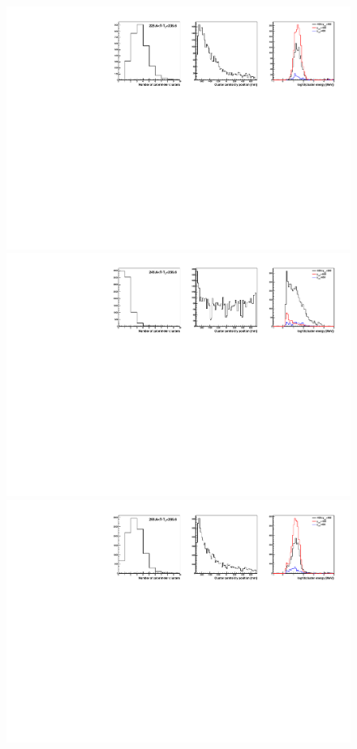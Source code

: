 \documentclass[preprint]{aastex631}
\begin{document}
\begin{figure}[t]
    \centering
    \includegraphics[width=0.9\linewidth]{paper_showEnergyCal_225p61_235p61_400.pdf}
    \includegraphics[width=0.9\linewidth]{paper_showEnergyCal_245p61_255p61_650.pdf}
    \includegraphics[width=0.9\linewidth]{paper_showEnergyCal_255p61_265p61_400.pdf}

\end{figure}
\end{document}
